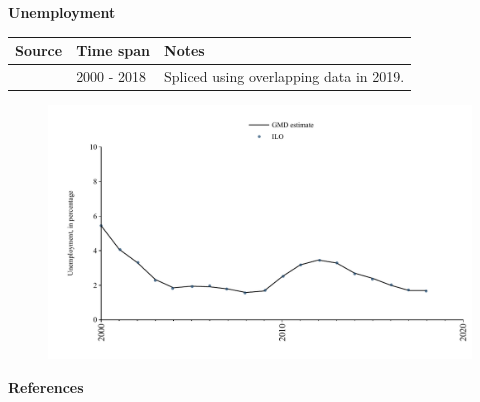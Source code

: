 \documentclass[12pt,a4paper,landscape]{article}
\begin{document}
\begin{adjustbox}{max totalsize={\paperwidth}{\paperheight},center}
\begin{minipage}[t][\textheight][t]{\textwidth}
\vspace*{0.5cm}
{}
\begin{center}
{\Large\bfseries Unemployment}
\end{center}
\vspace{0.5cm}
\begin{table}[H]
\centering
\small
\begin{tabular}{|l|l|l|}
\hline
\textbf{Source} & \textbf{Time span} & \textbf{Notes} \\
\hline
\rowcolor{white}\cite{ILO}& 2000 - 2018 &Spliced using overlapping data in 2019. \\
\hline
\end{tabular}
\end{table}
\begin{figure}[H]
\centering
\includegraphics[width=\textwidth,height=0.6\textheight,keepaspectratio]{graphs/CUB_unemp.pdf}
\end{figure}
\end{minipage}
\end{adjustbox}
{}
\begin{center}
{\Large\bfseries References}
\end{center}
\small


\end{document}
